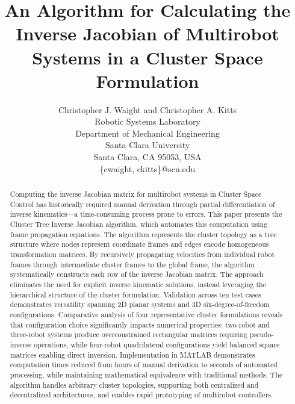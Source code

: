 \documentclass[lettersize,journal]{IEEEtran}
\begin{document}
\title{An Algorithm for Calculating the Inverse Jacobian of Multirobot Systems in a Cluster Space Formulation}

\author{Christopher J. Waight and Christopher A. Kitts\\
Robotic Systems Laboratory\\
Department of Mechanical Engineering\\
Santa Clara University\\
Santa Clara, CA 95053, USA\\
\{cwaight, ckitts\}@scu.edu}

\maketitle

\begin{abstract}
Computing the inverse Jacobian matrix for multirobot systems in Cluster Space Control has historically required manual derivation through partial differentiation of inverse kinematics—a time-consuming process prone to errors. This paper presents the Cluster Tree Inverse Jacobian algorithm, which automates this computation using frame propagation equations. The algorithm represents the cluster topology as a tree structure where nodes represent coordinate frames and edges encode homogeneous transformation matrices. By recursively propagating velocities from individual robot frames through intermediate cluster frames to the global frame, the algorithm systematically constructs each row of the inverse Jacobian matrix. The approach eliminates the need for explicit inverse kinematic solutions, instead leveraging the hierarchical structure of the cluster formulation. Validation across ten test cases demonstrates versatility spanning 2D planar systems and 3D six-degree-of-freedom configurations. Comparative analysis of four representative cluster formulations reveals that configuration choice significantly impacts numerical properties: two-robot and three-robot systems produce overconstrained rectangular matrices requiring pseudo-inverse operations, while four-robot quadrilateral configurations yield balanced square matrices enabling direct inversion. Implementation in MATLAB demonstrates computation times reduced from hours of manual derivation to seconds of automated processing, while maintaining mathematical equivalence with traditional methods. The algorithm handles arbitrary cluster topologies, supporting both centralized and decentralized architectures, and enables rapid prototyping of multirobot controllers.
\end{abstract}
\end{document}
